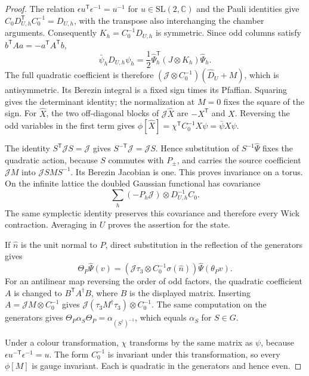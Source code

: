 \documentclass[11pt,letterpaper,reqno]{amsart}
\theoremstyle{definition}
\theoremstyle{remark}
\begin{document}
\begin{proof}
The relation $\epsilon u^{\mathsf T}\epsilon^{-1}=u^{-1}$
for $u\in\mathrm{SL}(2,\mathbb C)$ and the Pauli identities
give
$C_0D_{U,h}^{\mathsf T}C_0^{-1}=D_{U,h}$, with the transpose
also interchanging the chamber arguments. Consequently
$K_h=C_0^{-1}D_{U,h}$ is symmetric. Since odd columns satisfy
$b^{\mathsf T}Aa=-a^{\mathsf T}A^{\mathsf T}b$,
\[
 \bar\psi_hD_{U,h}\psi_h
 =\frac12\widehat\Psi_h^{\mathsf T}(J\otimes K_h)
                                      \widehat\Psi_h.
\]
The full quadratic coefficient is therefore
$(\mathcal J\otimes C_0^{-1})(\widehat D_U+M)$,
which is antisymmetric. Its Berezin integral is a fixed sign
times its Pfaffian. Squaring gives the determinant identity;
the normalization at $M=0$ fixes the square of the sign.
For $\widehat X$, the two off-diagonal blocks of
$\mathcal J\widehat X$ are $-X^{\mathsf T}$ and $X$.
Reversing the odd variables in the first term gives
$\phi[\widehat X]=\chi^{\mathsf T}C_0^{-1}X\psi
=\bar\psi X\psi$.

The identity $S^{\mathsf T}\mathcal JS=\mathcal J$ gives
$S^{-\mathsf T}\mathcal J=\mathcal JS$. Hence substitution
of $S^{-1}\widehat\Psi$ fixes the quadratic action, because
$S$ commutes with $P_\pm$, and carries the source coefficient
$\mathcal JM$ into $\mathcal JSMS^{-1}$. Its Berezin
Jacobian is one. This proves invariance on a torus.
On the infinite lattice the doubled Gaussian functional has
covariance
\[
 \sum_h(-P_h\mathcal J)\otimes D_{U,h}^{-1}C_0.
\]
The same symplectic identity preserves this covariance and
therefore every Wick contraction. Averaging in $U$ proves
the assertion for the state.

If $\hat n$ is the unit normal to $P$, direct substitution in
the reflection of the generators gives
\[
 \Theta_P\widehat\Psi(v)
  =(\mathcal J\tau_3\otimes C_0^{-1}\sigma(\hat n))
                                      \widehat\Psi(\theta_Pv).
\]
For an antilinear map reversing the order of odd factors, the
quadratic coefficient $A$ is changed to $B^{\mathsf T}A^\dagger B$,
where $B$ is the displayed matrix. Inserting
$A=\mathcal JM\otimes C_0^{-1}$ gives
$\mathcal J(\tau_3M^\dagger\tau_3)\otimes C_0^{-1}$.
The same computation on the generators gives
$\Theta_P\alpha_S\Theta_P=\alpha_{(S^\dagger)^{-1}}$,
which equals $\alpha_S$ for $S\in G$.

Under a colour transformation, $\chi$ transforms by the same
matrix as $\psi$, because $\epsilon u^{-\mathsf T}\epsilon^{-1}=u$.
The form $C_0^{-1}$ is invariant under this transformation,
so every $\phi[M]$ is gauge invariant. Each is quadratic in
the generators and hence even.
\end{proof}
\end{document}
